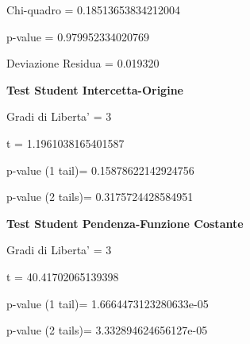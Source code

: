 \documentclass{article}
\begin{document}
Chi-quadro = 0.18513653834212004

p-value = 0.979952334020769

Deviazione Residua = 0.019320

\textbf{Test Student Intercetta-Origine}

Gradi di Liberta' = 3

t = 1.1961038165401587

p-value (1 tail)= 0.15878622142924756

p-value (2 tails)= 0.3175724428584951

\textbf{Test Student Pendenza-Funzione Costante}

Gradi di Liberta' = 3

t = 40.41702065139398

p-value (1 tail)= 1.6664473123280633e-05

p-value (2 tails)= 3.332894624656127e-05
\end{document}

